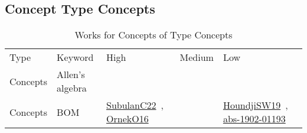 \clearpage
\subsection{Concept Type Concepts}
\label{sec:Concepts}
{\scriptsize
\begin{longtable}{lp{3cm}>{\raggedright\arraybackslash}p{6cm}>{\raggedright\arraybackslash}p{6cm}>{\raggedright\arraybackslash}p{8cm}}
\rowcolor{white}\caption{Works for Concepts of Type Concepts}\\ \toprule
\rowcolor{white}Type & Keyword & High & Medium & Low\\ \midrule\endhead
\bottomrule
\endfoot
Concepts & Allen's algebra &  &  & \\
Concepts & BOM & \href{../works/SubulanC22.pdf}{SubulanC22}~\cite{SubulanC22}, \href{../works/OrnekO16.pdf}{OrnekO16}~\cite{OrnekO16} &  & \href{../works/HoundjiSW19.pdf}{HoundjiSW19}~\cite{HoundjiSW19}, \href{../works/abs-1902-01193.pdf}{abs-1902-01193}~\cite{abs-1902-01193}\\

\end{longtable}}
